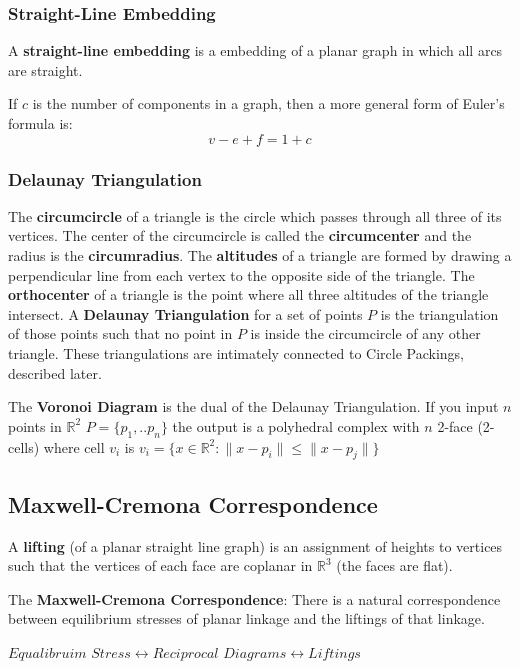 \documentclass{article}
\newcommand{\R}{\mathbb{R}}
\begin{document}
  \subsubsection{Straight-Line Embedding}
  A \textbf{straight-line embedding} is a embedding of a planar graph in which all arcs are straight.


  If $c$ is the number of components in a graph, then a more general form of Euler's formula is:
  \begin{equation} 
	v-e+f= 1 + c
  \end{equation}
  
  \subsubsection{Delaunay Triangulation}
  The \textbf{circumcircle} of a triangle is the circle which passes through all three of its vertices. The center of the circumcircle is called the \textbf{circumcenter} and the radius is the \textbf{circumradius}.
  The \textbf{altitudes} of a triangle are formed by drawing a perpendicular line from each vertex to the opposite side of the triangle. The \textbf{orthocenter} of a triangle is the point where all three altitudes of the triangle intersect.
  A \textbf{Delaunay Triangulation} for a set of points $P$ is the triangulation of those points such that no point in $P$ is inside the circumcircle of any other triangle. These triangulations are intimately connected to Circle Packings, described later.
  
  The \textbf{Voronoi Diagram} is the dual of the Delaunay Triangulation. If you input $n$ points in $\R^2$ $P=\{p_1,..p_n\}$ the output is a polyhedral complex with $n$ 2-face (2-cells) where cell $v_i$ is $v_i = \{x \in \R^2 : \| x - p_i \| \leq \| x - p_j\|\}$
  
 \subsection{Maxwell-Cremona Correspondence}
 A \textbf{lifting} (of a planar straight line graph) is an assignment of heights to vertices such that the vertices of each face are coplanar in $\R^3$ (the faces are flat).
 
 The \textbf{Maxwell-Cremona Correspondence}: There is a natural correspondence between equilibrium stresses of planar linkage and the liftings of that linkage.
 
 $Equalibruim$  $Stress \leftrightarrow Reciprocal$ $Diagrams \leftrightarrow Liftings$
 
\end{document}
